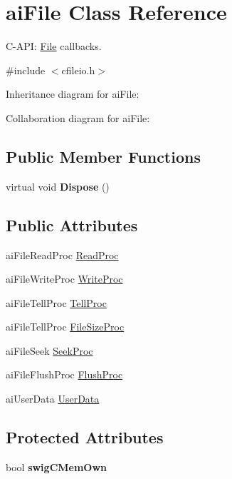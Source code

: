 \hypertarget{structai_file}{\section{ai\+File Class Reference}
\label{structai_file}
}


C-\/\+A\+P\+I\+: \hyperlink{class_file}{File} callbacks.  




{\ttfamily \#include $<$cfileio.\+h$>$}



Inheritance diagram for ai\+File\+:


Collaboration diagram for ai\+File\+:
\subsection*{Public Member Functions}
\begin{DoxyCompactItemize}
\item 
\hypertarget{structai_file_a0ecedb46ceac1247f5394af3f5e3083b}{virtual void {\bfseries Dispose} ()}\label{structai_file_a0ecedb46ceac1247f5394af3f5e3083b}

\end{DoxyCompactItemize}
\subsection*{Public Attributes}
\begin{DoxyCompactItemize}
\item 
ai\+File\+Read\+Proc \hyperlink{structai_file_a52287e81ca67b9d43cc1ce6142f781fa}{Read\+Proc}
\item 
ai\+File\+Write\+Proc \hyperlink{structai_file_ab9fca3a62e34a33592c13a6f31db7d1d}{Write\+Proc}
\item 
ai\+File\+Tell\+Proc \hyperlink{structai_file_aaf2d88a3b2fcbdacf51119658283d27e}{Tell\+Proc}
\item 
ai\+File\+Tell\+Proc \hyperlink{structai_file_aff2fff8c0458e7ec71f7de217c3a3033}{File\+Size\+Proc}
\item 
ai\+File\+Seek \hyperlink{structai_file_a7a07b499be4ad433669246479a4d4ad2}{Seek\+Proc}
\item 
ai\+File\+Flush\+Proc \hyperlink{structai_file_a1102d28d1c0be68ffed20476669bdb0d}{Flush\+Proc}
\item 
ai\+User\+Data \hyperlink{structai_file_aec528fa18f4755fe4f28d604fde28aad}{User\+Data}
\end{DoxyCompactItemize}
\subsection*{Protected Attributes}
\begin{DoxyCompactItemize}
\item 
\hypertarget{structai_file_af3c8484805d299967de6658f5737bd8a}{bool {\bfseries swig\+C\+Mem\+Own}}\label{structai_file_af3c8484805d299967de6658f5737bd8a}

\end{DoxyCompactItemize}
